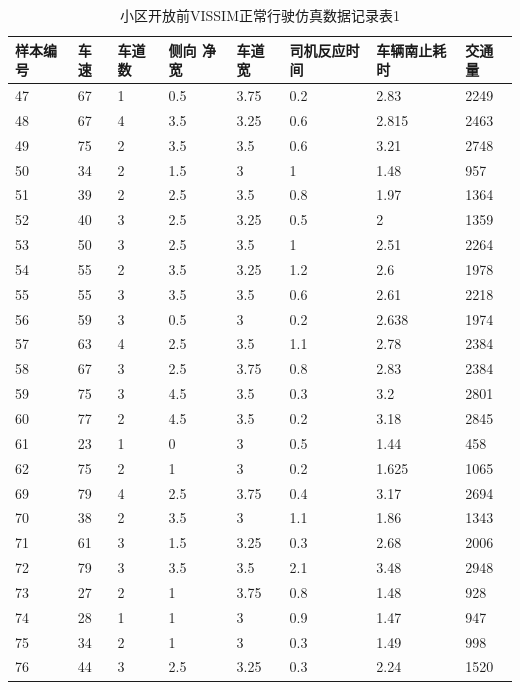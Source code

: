 \begin{table}[h!]
  \centering
 \small\renewcommand{}
  \caption{小区开放前VISSIM正常行驶仿真数据记录表1}
\begin{tabular*}{\linewidth}{p{45pt}<{\centering}p{25pt}<{\centering}
p{35pt}<{\centering}p{45pt}<{\centering}p{35pt}<{\centering}p{66pt}<{\centering}
p{66pt}<{\centering}p{40pt}<{\centering}}
\toprule
样本编号 &  车速 & 车道数  & 侧向 净宽 &  车道宽  &  司机反应时间  & 车辆南止耗时  &  交通量  \\
\midrule
47 & 67 & 1 & 0.5 & 3.75 & 0.2 & 2.83 & 2249 \\
48 & 67 & 4 & 3.5 & 3.25 & 0.6 & 2.815 & 2463 \\
49 & 75 & 2 & 3.5 & 3.5 & 0.6 & 3.21 & 2748 \\
50 & 34 & 2 & 1.5 & 3 & 1 & 1.48 & 957 \\
51 & 39 & 2 & 2.5 & 3.5 & 0.8 & 1.97 & 1364 \\
52 & 40 & 3 & 2.5 & 3.25 & 0.5 & 2 & 1359 \\
53 & 50 & 3 & 2.5 & 3.5 & 1 & 2.51 & 2264 \\
54 & 55 & 2 & 3.5 & 3.25 & 1.2 & 2.6 & 1978 \\
55 & 55 & 3 & 3.5 & 3.5 & 0.6 & 2.61 & 2218 \\
56 & 59 & 3 & 0.5 & 3 & 0.2 & 2.638 & 1974 \\
57 & 63 & 4 & 2.5 & 3.5 & 1.1 & 2.78 & 2384 \\
58 & 67 & 3 & 2.5 & 3.75 & 0.8 & 2.83 & 2384 \\
59 & 75 & 3 & 4.5 & 3.5 & 0.3 & 3.2 & 2801 \\
60 & 77 & 2 & 4.5 & 3.5 & 0.2 & 3.18 & 2845 \\
61 & 23 & 1 & 0 & 3 & 0.5 & 1.44 & 458 \\
62 & 75 & 2 & 1 & 3 & 0.2 & 1.625 & 1065 \\ 
69 & 79 & 4 & 2.5 & 3.75 & 0.4 & 3.17 & 2694 \\
70 & 38 & 2 & 3.5 & 3 & 1.1 & 1.86 & 1343 \\
71 & 61 & 3 & 1.5 & 3.25 & 0.3 & 2.68 & 2006 \\
72 & 79 & 3 & 3.5 & 3.5 & 2.1 & 3.48 & 2948 \\
73 & 27 & 2 & 1 & 3.75 & 0.8 & 1.48 & 928 \\
74 & 28 & 1 & 1 & 3 & 0.9 & 1.47 & 947 \\
75 & 34 & 2 & 1 & 3 & 0.3 & 1.49 & 998 \\
76 & 44 & 3 & 2.5 & 3.25 & 0.3 & 2.24 & 1520 \\

\end{tabular*}
\end{table}
